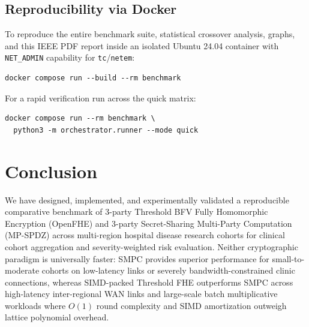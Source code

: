 \documentclass[conference]{IEEEtran}
\begin{document}
\subsection{Reproducibility via Docker}
To reproduce the entire benchmark suite, statistical crossover analysis, graphs, and this IEEE PDF report inside an isolated Ubuntu 24.04 container with \texttt{NET\_ADMIN} capability for \texttt{tc}/\texttt{netem}:
\begin{verbatim}
docker compose run --build --rm benchmark
\end{verbatim}
For a rapid verification run across the quick matrix:
\begin{verbatim}
docker compose run --rm benchmark \
  python3 -m orchestrator.runner --mode quick
\end{verbatim}

\section{Conclusion}
We have designed, implemented, and experimentally validated a reproducible comparative benchmark of 3-party Threshold BFV Fully Homomorphic Encryption (OpenFHE) and 3-party Secret-Sharing Multi-Party Computation (MP-SPDZ) across multi-region hospital disease research cohorts for clinical cohort aggregation and severity-weighted risk evaluation. Neither cryptographic paradigm is universally faster: SMPC provides superior performance for small-to-moderate cohorts on low-latency links or severely bandwidth-constrained clinic connections, whereas SIMD-packed Threshold FHE outperforms SMPC across high-latency inter-regional WAN links and large-scale batch multiplicative workloads where $O(1)$ round complexity and SIMD amortization outweigh lattice polynomial overhead.
\end{document}

